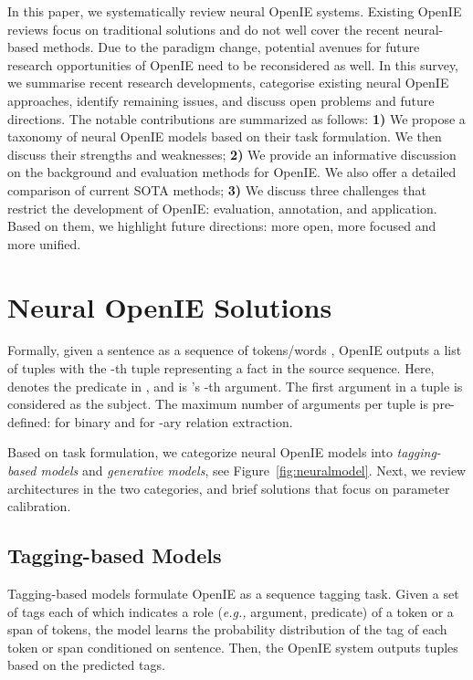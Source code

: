\documentclass{article}
\newcommand{\eg}{\emph{e.g.,}\xspace}
\begin{document}
In this paper, we systematically review neural OpenIE systems.
Existing OpenIE reviews \cite{niklaus-etal-2018-survey,glauber2018systematic,claro2019multilingual} focus on traditional solutions and do not well cover the recent neural-based methods. 
Due to the paradigm change, potential avenues for future research opportunities of OpenIE need to be reconsidered as well.
In this survey, we summarise recent research developments, categorise existing neural OpenIE approaches, identify remaining issues, and discuss open problems and future directions.
The notable contributions are summarized as follows:
\textbf{1)} We propose a taxonomy of neural OpenIE models based on their task formulation. We then discuss their strengths and weaknesses;
\textbf{2)} We provide an informative discussion on the background and evaluation methods for OpenIE. We also  offer a detailed comparison of current SOTA methods; 
\textbf{3)} We discuss three challenges that restrict the development of OpenIE: evaluation, annotation, and application.  Based on them, we highlight future  directions: more open, more focused and more unified.

\section{Neural OpenIE Solutions}
\label{sec:methods}
Formally, given a sentence as a sequence of tokens/words , OpenIE outputs a list of tuples  with the -th tuple  representing a fact in the source sequence. 
Here,  denotes the predicate in , and  is 's -th argument. The first argument in a tuple is considered as the subject. The maximum number of arguments  per tuple is pre-defined:   for binary and  for -ary relation extraction.

Based on task formulation, we categorize neural OpenIE models into \textit{tagging-based models} and \textit{generative models}, see Figure~\ref{fig:neuralmodel}. Next, we review architectures in the two categories, and brief solutions that focus on parameter calibration.

\subsection{Tagging-based Models}
Tagging-based models formulate OpenIE as a sequence tagging task. Given a set of tags each of which indicates a role (\eg argument, predicate) of a token or a span of tokens, the model learns the probability distribution of the tag of each token or span conditioned on sentence. Then, the OpenIE system outputs tuples based on the predicted tags.
\end{document}

